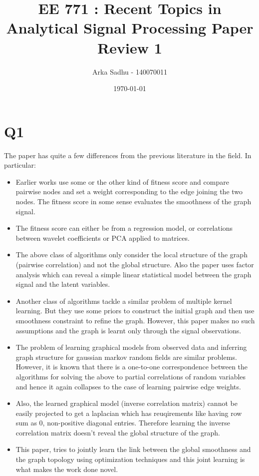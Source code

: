 \documentclass{article}
\title{EE 771 : Recent Topics in Analytical Signal Processing Paper Review 1}
\author{Arka Sadhu - 140070011}
\date{\today}
\begin{document}
\maketitle

\section*{Q1}
The paper has quite a few differences from the previous literature in the field. In particular:
\begin{itemize}
\item Earlier works use some or the other kind of fitness score and compare pairwise nodes and set a weight corresponding to the edge joining the two nodes. The fitness score in some sense evaluates the smoothness of the graph signal.
\item The fitness score can either be from a regression model, or correlations between wavelet coefficients or PCA applied to matrices.
\item The above class of algorithms only consider the local structure of the graph (pairwise correlation) and not the global structure. Also the paper uses factor analysis which can reveal a simple linear statistical model between the graph signal and the latent variables.
\item Another class of algorithms tackle a similar problem of multiple kernel learning. But they use some priors to construct the initial graph and then use smoothness constraint to refine the graph. However, this paper makes no such assumptions and the graph is learnt only through the signal observations.
\item The problem of learning graphical models from observed data and inferring graph structure for gaussian markov random fields are similar problems. However, it is known that there is a one-to-one correspondence between the algorithms for solving the above to partial correlations of random variables and hence it again collapses to the case of learning pairwise edge weights.
\item Also, the learned graphical model (inverse correlation matrix) cannot be easily projected to get a laplacian which has reuqirements like having row sum as 0, non-positive diagonal entries. Therefore learning the inverse correlation matrix doesn't reveal the global structure of the graph.
\item This paper, tries to jointly learn the link between the global smoothness and the graph topology using optimization techniques and this joint learning is what makes the work done novel.
\end{itemize}
\end{document}
